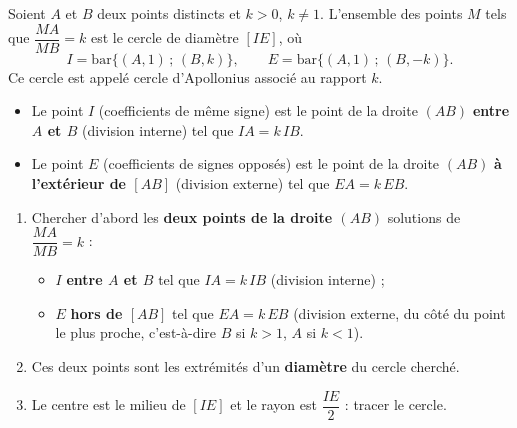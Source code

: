 \documentclass[11pt]{article}
\newcommand{\cle}[1]{{\popxbold\color{popdark}#1}}
\begin{document}
\begin{propriete}
Soient $A$ et $B$ deux points distincts et $k>0$, $k\neq 1$. L'ensemble des points $M$ tels que $\dfrac{MA}{MB}=k$ est le cercle de diamètre $[IE]$, où
\[
I=\mathrm{bar}\{(A,1)\,;\,(B,k)\}, \qquad E=\mathrm{bar}\{(A,1)\,;\,(B,-k)\}.
\]
Ce cercle est appelé \cle{cercle d'Apollonius} associé au rapport $k$.
\begin{itemize}
\item Le point $I$ (coefficients de même signe) est le point de la droite $(AB)$ \textbf{entre $A$ et $B$} (division interne) tel que $IA=k\,IB$.
\item Le point $E$ (coefficients de signes opposés) est le point de la droite $(AB)$ \textbf{à l'extérieur de $[AB]$} (division externe) tel que $EA=k\,EB$.
\end{itemize}
\end{propriete}

\begin{methode}[Construire l'ensemble $\dfrac{MA}{MB}=k$]
\begin{enumerate}
\item Chercher d'abord les \textbf{deux points de la droite $(AB)$} solutions de $\dfrac{MA}{MB}=k$ :
\begin{itemize}
\item $I$ \textbf{entre $A$ et $B$} tel que $IA=k\,IB$ (division interne) ;
\item $E$ \textbf{hors de $[AB]$} tel que $EA=k\,EB$ (division externe, du côté du point le plus proche, c'est-à-dire $B$ si $k>1$, $A$ si $k<1$).
\end{itemize}
\item Ces deux points sont les extrémités d'un \textbf{diamètre} du cercle cherché.
\item Le centre est le milieu de $[IE]$ et le rayon est $\dfrac{IE}{2}$ : tracer le cercle.
\end{enumerate}
\end{methode}
\end{document}
